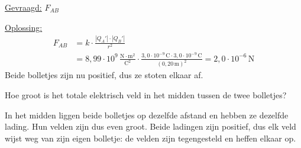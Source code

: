 \documentclass{ximera}
\begin{document}
\begin{exercise}
\begin{question}
\begin{solution}
            \underline{Gevraagd:} $F_{AB}$

            \underline{Oplossing:}
            \begin{align*}
                F_{AB} &= k \cdot \frac{|Q_A'| \cdot |Q_B'|}{r^2} \\
                &= 8{,}99 \cdot 10^{9} \, \mathrm{\frac{N \cdot m^2}{C^2}} \cdot \frac{3{,}0 \cdot 10^{-9} \, \mathrm{C} \cdot 3{,}0 \cdot 10^{-9} \, \mathrm{C}}{(0{,}20 \, \mathrm{m})^2} = \boxed{2{,}0 \cdot 10^{-6} \, \mathrm{N}}
            \end{align*}
            Beide bolletjes zijn nu positief, dus ze stoten elkaar af.
        \end{solution}
    \end{question}

    \begin{question}
        Hoe groot is het totale elektrisch veld in het midden tussen de twee bolletjes?

        \begin{multipleChoice}
        \end{multipleChoice}

        \begin{solution}\nl
            In het midden liggen beide bolletjes op dezelfde afstand en hebben ze dezelfde lading. Hun velden zijn dus even groot. Beide ladingen zijn positief, dus elk veld wijst weg van zijn eigen bolletje: de velden zijn tegengesteld en heffen elkaar op.
        \end{solution}
    \end{question}
\end{exercise}
\end{document}
